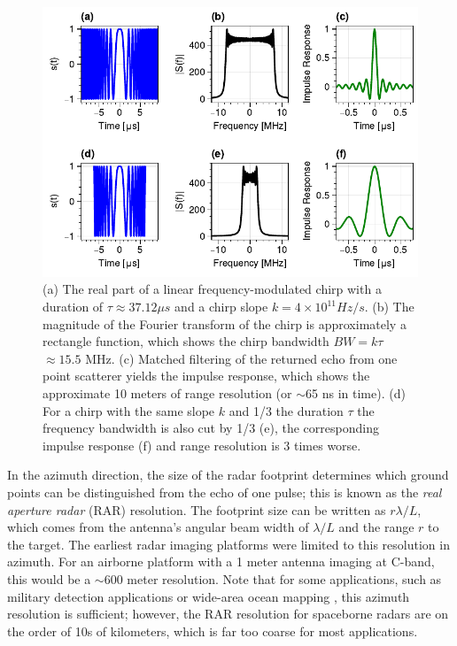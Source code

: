 \begin{figure}
	\centering
	\includegraphics[width=0.99\linewidth]{figures/chapter3-sar/radar-chirp-bandwidth-ers.pdf}
	\caption[Range resolution from chirp compression]{
		(a) The real part of a linear frequency-modulated chirp with a duration of $\tau \approx 37.12 \mu s$ and a chirp slope $k = 4 \times 10^{11} Hz / s$.
		(b) The magnitude of the Fourier transform of the chirp is approximately a rectangle function, which shows the chirp bandwidth $BW = k \tau$ $\approx 15.5$ MHz.
		(c) Matched filtering of the returned echo from one point scatterer yields the impulse response, which shows the approximate 10 meters of range resolution (or $\sim$65 ns in time).
		(d) For a chirp with the same slope $k$ and 1/3 the duration $\tau$ the frequency bandwidth is also cut by 1/3 (e), the corresponding impulse response (f) and range resolution is 3 times worse.
	}
	\label{fig:ch3-range-compress}
\end{figure}


In the azimuth direction, the size of the radar footprint determines which ground points can be distinguished from the echo of one pulse;  this is known as the \emph{real aperture radar} (RAR) resolution. The footprint size can be written as $r \lambda / L$, which comes from the antenna's angular beam width of $\lambda / L$ and the range $r$ to the target. The earliest radar imaging platforms were limited to this resolution in azimuth. For an airborne platform with a 1 meter antenna imaging at C-band, this would be a $\sim$600 meter resolution. Note that for some applications, such as military detection applications or wide-area ocean mapping \cite{Simons2007InterferometricSyntheticAperture}, this azimuth resolution is sufficient; however, the RAR resolution for spaceborne radars are on the order of 10s of kilometers, which is far too coarse for most applications.


